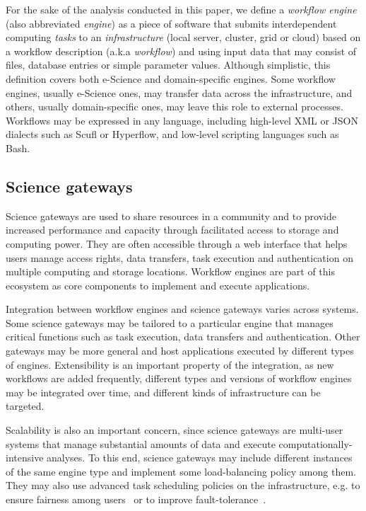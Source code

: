 \documentclass[preprint,3p,twocolumn]{elsarticle}
\begin{document}
For the sake of the analysis conducted in this paper, we define a
\emph{workflow engine} (also abbreviated \emph{engine}) as a piece of
software that submits interdependent computing \emph{tasks} to an
\emph{infrastructure} (local server, cluster, grid or cloud) based on
a workflow description (a.k.a \emph{workflow}) and using input data
that may consist of files, database entries or simple parameter
values. Although simplistic, this definition covers both e-Science and
domain-specific engines. Some workflow engines, usually e-Science
ones, may transfer data across the infrastructure, and others, usually
domain-specific ones, may leave this role to external processes. Workflows
may be expressed in any language, including high-level XML or JSON
dialects such as Scufl or Hyperflow, and low-level scripting languages
such as Bash.

\subsection{Science gateways}

Science gateways are used to share resources in a community and to
provide increased performance and capacity through facilitated access to storage and
computing power. They are often accessible through a web interface
that helps users manage access rights, data transfers, task execution
and authentication on multiple computing and storage
locations. Workflow engines are part of this ecosystem as core
components to implement and execute applications.


Integration between workflow engines and science gateways varies
across systems. Some science gateways may be tailored to a particular
engine that manages critical functions such as task execution, data
transfers and authentication. Other gateways may be more general and
host applications executed by different types of
engines. Extensibility is an important property of the integration, as
new workflows are added frequently, different types and versions of
workflow engines may be integrated over time, and different kinds of
infrastructure can be targeted.

Scalability is also an important concern, since science gateways are
multi-user systems that manage substantial amounts of data and execute
computationally-intensive analyses. To this end, science gateways
may include different instances of the same engine type and implement
some load-balancing policy among them. They may also use advanced
task scheduling policies on the infrastructure, e.g. to ensure fairness
among users~\cite{FERR-14,CPE:CPE3708} or to improve
fault-tolerance~\cite{wilkins2008teragrid,FERR-13}.
\end{document}
